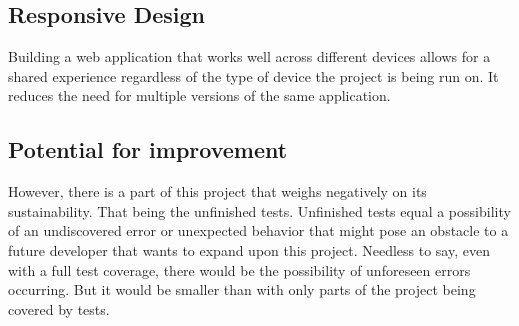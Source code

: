 \subsection{Responsive Design}
Building a web application that works well across different devices allows for a shared experience regardless of the type of device the project is being run on. It reduces the need for multiple versions of the same application.

\subsection{Potential for improvement}
However, there is a part of this project that weighs negatively on its sustainability. That being the unfinished tests. Unfinished tests equal a possibility of an undiscovered error or unexpected behavior that might pose an obstacle to a future developer that wants to expand upon this project. Needless to say, even with a full test coverage, there would be the possibility of unforeseen errors occurring. But it would be smaller than with only parts of the project being covered by tests.
